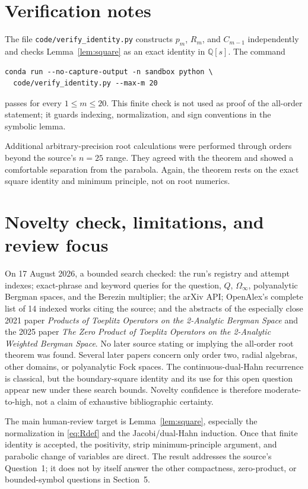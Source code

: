 \documentclass[11pt]{article}
\newcommand{\Om}{\Omega_\infty}
\begin{document}
\section{Verification notes}

The file \texttt{code/verify\_identity.py} constructs $p_m$, $R_m$, and $C_{m-1}$ independently and checks Lemma~\ref{lem:square} as an exact identity in $\mathbb Q[s]$.  The command
\begin{verbatim}
conda run --no-capture-output -n sandbox python \
  code/verify_identity.py --max-m 20
\end{verbatim}
passes for every $1\le m\le20$.  This finite check is not used as proof of the all-order statement; it guards indexing, normalization, and sign conventions in the symbolic lemma.

Additional arbitrary-precision root calculations were performed through orders beyond the source's $n=25$ range.  They agreed with the theorem and showed a comfortable separation from the parabola.  Again, the theorem rests on the exact square identity and minimum principle, not on root numerics.

\section{Novelty check, limitations, and review focus}

On 17 August 2026, a bounded search checked: the run's registry and attempt indexes; exact-phrase and keyword queries for the question, $Q$, $\Om$, polyanalytic Bergman spaces, and the Berezin multiplier; the arXiv API; OpenAlex's complete list of 14 indexed works citing the source; and the abstracts of the especially close 2021 paper \emph{Products of Toeplitz Operators on the 2-Analytic Bergman Space} and the 2025 paper \emph{The Zero Product of Toeplitz Operators on the 2-Analytic Weighted Bergman Space}.  No later source stating or implying the all-order root theorem was found.  Several later papers concern only order two, radial algebras, other domains, or polyanalytic Fock spaces.  The continuous-dual-Hahn recurrence is classical, but the boundary-square identity and its use for this open question appear new under these search bounds.  Novelty confidence is therefore moderate-to-high, not a claim of exhaustive bibliographic certainty.

The main human-review target is Lemma~\ref{lem:square}, especially the normalization in \eqref{eq:Rdef} and the Jacobi/dual-Hahn induction.  Once that finite identity is accepted, the positivity, strip minimum-principle argument, and parabolic change of variables are direct.  The result addresses the source's Question~1; it does not by itself answer the other compactness, zero-product, or bounded-symbol questions in Section~5.
\end{document}
